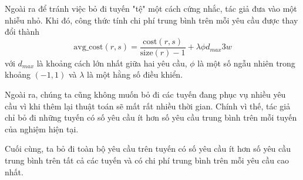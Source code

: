 Ngoài ra để tránh việc bỏ đi tuyến "tệ" một cách cứng nhắc, tác giả đưa vào một nhiễu nhỏ. Khi đó, công thức tính chi phí trung bình trên mỗi yêu cầu được thay đổi thành
\begin{equation}
	\label{eq:destroy_route}
	\text{avg\_cost}(r, s) = \frac{\text{cost}(r, s)}{\text{size}(r)-1} + \lambda \phi d_{max}3w
\end{equation}
với $d_{max}$ là khoảng cách lớn nhất giữa hai yêu cầu, $\phi$ là một số ngẫu nhiên trong khoảng $(-1,1)$ và $\lambda$ là một hằng số điều khiển.

Ngoài ra, chúng ta cũng không muốn bỏ đi các tuyến đang phục vụ nhiều yêu cầu vì khi thêm lại thuật toán sẽ mất rất nhiều thời gian. Chính vì thế, tác giả chỉ bỏ đi những tuyến có số yêu cầu ít hơn số yêu cầu trung bình trên mỗi tuyến của nghiệm hiện tại.

Cuối cùng, ta bỏ đi toàn bộ yêu cầu trên tuyến có số yêu cầu ít hơn số yêu cầu trung bình trên tất cả các tuyến và có chi phí trung bình trên mỗi yêu cầu cao nhất.